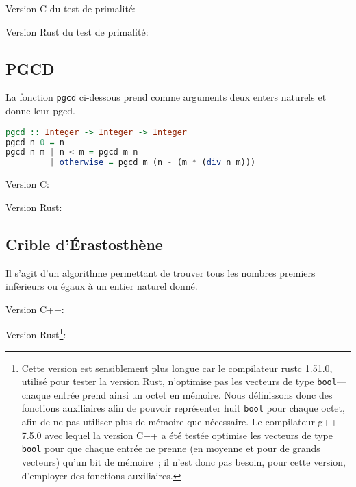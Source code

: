 \medskip

\noindent Version C du test de primalité: 


\medskip

\noindent Version Rust du test de primalité: 


\subsection{PGCD}
\label{app:Haskell_pgcd}

\noindent 
La fonction \texttt{pgcd} ci-dessous prend comme arguments deux enters naturels et donne leur pgcd.
\begin{lstlisting}[language=Haskell]
pgcd :: Integer -> Integer -> Integer
pgcd n 0 = n
pgcd n m | n < m = pgcd m n
         | otherwise = pgcd m (n - (m * (div n m)))
\end{lstlisting}

\medskip

\noindent Version C: 


\medskip

\noindent Version Rust: 


\subsection{Crible d'Érastosthène}

Il s'agit d'un algorithme permettant de trouver tous les nombres premiers infèrieurs ou égaux à un entier naturel donné.

\bigskip

\noindent Version C++: 


\bigskip

\noindent Version Rust\footnote{
    Cette version est sensiblement plus longue car le compilateur rustc 1.51.0, utilisé pour tester la version Rust, n'optimise pas les vecteurs de type \texttt{bool}—chaque entrée prend ainsi un octet en mémoire. 
    Nous définissons donc des fonctions auxiliaires afin de pouvoir représenter huit \texttt{bool} pour chaque octet, afin de ne pas utiliser plus de mémoire que nécessaire.
    Le compilateur g++ 7.5.0 avec lequel la version C++ a été testée optimise les vecteurs de type \texttt{bool} pour que chaque entrée ne prenne (en moyenne et pour de grands vecteurs) qu'un bit de mémoire ; il n'est donc pas besoin, pour cette version, d'employer des fonctions auxiliaires. 
}: 

